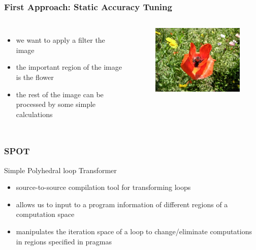 \documentclass{beamer}\usetheme{Madrid} %
\begin{document}
\begin{frame}
    \frametitle { First Approach: Static Accuracy Tuning }
    \begin{columns}
    \begin{itemize}
		\item
			we want to apply a filter the image
		\item
			the important region of the image is the flower
		\item
			the rest of the image can be processed by some simple 
			calculations
	\end{itemize}
		\begin{figure}
			\includegraphics[scale=0.32]{img/rose.jpg}
		\end{figure}
    \end{columns}
\end{frame}
\begin{frame}
    \frametitle {SPOT} Simple Polyhedral loop Transformer
    \begin{itemize}
	\item 
		source-to-source compilation tool for transforming loops
	\item
		allows us to input to a program information of different regions
		of a computation space
	\item
		manipulates the iteration space of a loop to change/eliminate 
		computations in regions specified in pragmas
    \end{itemize}
\end{frame}
\end{document}
